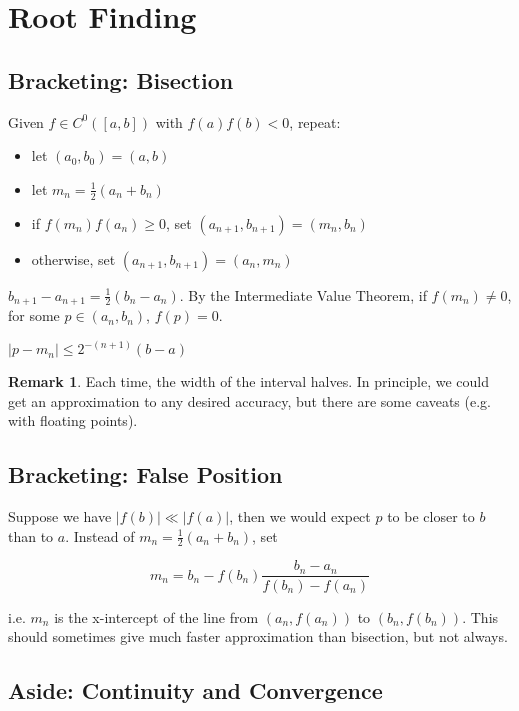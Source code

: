 \documentclass[12pt,a4paper]{article}
\theoremstyle{definition}
\newtheorem*{remark}{Remark}
\begin{document}
\maketitle
\section{Root Finding}

\subsection{Bracketing: Bisection}

Given $f \in C^0 ([a, b])$ with $f(a) f(b) < 0$, repeat:
\begin{itemize}
	\item let $(a_0, b_0) = (a, b)$
	\item let $m_n = \frac{1}{2} (a_n + b_n)$
	\item if $f(m_n)f(a_n) \ge 0$, set $(a_{n + 1}, b_{n + 1}) = (m_n, b_n)$
	\item otherwise, set $(a_{n + 1}, b_{n + 1}) = (a_n, m_n)$
\end{itemize}

$b_{n + 1} - a_{n + 1} = \frac{1}{2} (b_n - a_n)$. By the Intermediate Value Theorem, if $f(m_n) \ne 0$, for some $p \in (a_n, b_n)$, $f(p) = 0$.

$|p - m_n| \le 2^{-(n + 1)} (b - a)$

\begin{remark}
	Each time, the width of the interval halves. In principle, we could get an approximation to any desired accuracy, but there are some caveats (e.g. with floating points).
\end{remark}

\subsection{Bracketing: False Position}

Suppose we have $|f(b)| \ll |f(a)|$, then we would expect $p$ to be closer to $b$ than to $a$. Instead of $m_n = \frac{1}{2} (a_n + b_n)$, set

\[m_n = b_n - f(b_n) \frac{b_n - a_n}{f(b_n) - f(a_n)}\]

i.e. $m_n$ is the x-intercept of the line from $(a_n, f(a_n))$ to $(b_n, f(b_n))$. This should sometimes give much faster approximation than bisection, but not always.

\subsection{Aside: Continuity and Convergence}
\end{document}
